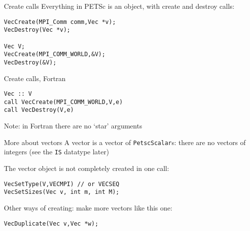 
\lstset{language=C}


\begin{details}
\begin{numberedframe}{Create calls}
\small
Everything in PETSc is an object, with create and destroy calls:
\begin{lstlisting}
VecCreate(MPI_Comm comm,Vec *v);
VecDestroy(Vec *v);

Vec V;
VecCreate(MPI_COMM_WORLD,&V);
VecDestroy(&V);
\end{lstlisting}
\end{numberedframe}

\lstset{language=Fortran}
\begin{fortran}
\begin{numberedframe}{Create calls, Fortran}
\begin{lstlisting}
Vec :: V
call VecCreate(MPI_COMM_WORLD,V,e)
call VecDestroy(V,e)
\end{lstlisting}
Note: in Fortran there are no `star' arguments
\end{numberedframe}
\end{fortran}
\lstset{language=C}

\begin{numberedframe}{More about vectors}
A vector is a vector of \lstinline{PetscScalar}s: there are no vectors of
integers (see the \lstinline{IS} datatype later)

The vector object is not completely created in one call:
\begin{lstlisting}
VecSetType(V,VECMPI) // or VECSEQ
VecSetSizes(Vec v, int m, int M);
\end{lstlisting}
Other ways of creating: make more vectors like this one:
\begin{lstlisting}
VecDuplicate(Vec v,Vec *w);
\end{lstlisting}
\end{numberedframe}

\end{details}

